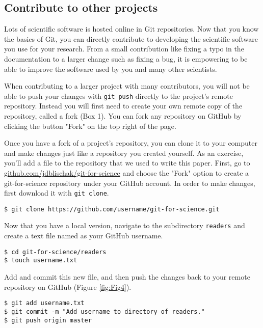 \subsection{Contribute to other projects}

Lots of scientific software is hosted online in Git repositories.
Now that you know the basics of Git, you can directly contribute to developing the scientific software you use for your research.
From a small contribution like fixing a typo in the documentation to a larger change such as fixing a bug, it is empowering to be able to improve the software used by you and many other scientists.

When contributing to a larger project with many contributors, you will not be able to push your changes with \verb|git push| directly to the project's remote repository.
Instead you will first need to create your own remote copy of the repository, called a fork (Box 1).
You can fork any repository on GitHub by clicking the button "Fork" on the top right of the page.

Once you have a fork of a project's repository, you can clone it to your computer and make changes just like a repository you created yourself.
As an exercise, you'll add a file to the repository that we used to write this paper.
First, go to \href{https://github.com/jdblischak/git-for-science}{github.com/jdblischak/git-for-science} and choose the "Fork" option to create a git-for-science repository under your GitHub account.
In order to make changes, first download it with \verb|git clone|.

\begin{lstlisting}
$ git clone https://github.com/username/git-for-science.git
\end{lstlisting}

Now that you have a local version, navigate to the subdirectory \verb|readers| and create a text file named as your GitHub username.

\begin{lstlisting}
$ cd git-for-science/readers
$ touch username.txt
\end{lstlisting}

Add and commit this new file, and then push the changes back to your remote repository on GitHub (Figure \ref{fig:Fig4}).

\begin{lstlisting}
$ git add username.txt
$ git commit -m "Add username to directory of readers."
$ git push origin master
\end{lstlisting}

